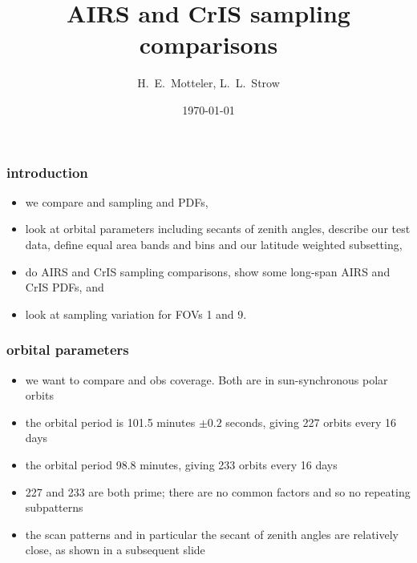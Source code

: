 \documentclass[11pt]{beamer}
\title{AIRS and CrIS sampling comparisons}
\author{H.~E.~Motteler, L.~L.~Strow}
\institute{
  UMBC Atmospheric Spectroscopy Lab \\
  Joint Center for Earth Systems Technology \\
}
\date{\today}
\begin{document}
\begin{frame}[plain]
\titlepage
\end{frame}
\begin{frame}
\frametitle{introduction}

\begin{itemize}

  \item we compare {\airs} and {\cris} sampling and PDFs,

  \item look at orbital parameters including secants of zenith
    angles, describe our test data, define equal area bands and bins
    and our latitude weighted subsetting, 

  \item do AIRS and CrIS sampling comparisons, show some
    long-span AIRS and CrIS PDFs, and

  \item look at sampling variation for {\cris} FOVs 1 and 9.

\end{itemize}

\end{frame}
\begin{frame}
\frametitle{orbital parameters}

\begin{itemize}

  \item we want to compare {\airs} and {\cris} obs coverage.  Both
    are in sun-synchronous polar orbits

  \item the {\cris} orbital period is 101.5 minutes $\pm 0.2$
    seconds, giving 227 orbits every 16 days

  \item the {\airs} orbital period 98.8 minutes, giving 233 orbits
    every 16 days

  \item 227 and 233 are both prime; there are no common factors and
    so no repeating subpatterns

  \item the scan patterns and in particular the secant of zenith
    angles are relatively close, as shown in a subsequent slide

\end{itemize}
\end{frame}
\end{document}
